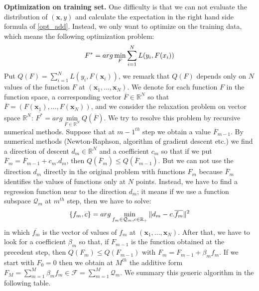 \documentclass[a4paper,twoside,12pt]{article}
\begin{document}
\textbf{Optimization on training set.} One difficulty is that we can not evaluate the distribution of $(\textbf{x}, y)$ and calculate the expectation in the right hand side formula of \eqref{opt_add}. Instead, we only want to optimize on the training data, which means the following optimization problem:
\begin{align}
    F^{*} = arg\min\limits_{F} \sum\limits_{i=1}^N L(y_i, F(x_i)) \notag
\end{align}
Put $Q(F) = \sum\limits_{i=1}^N L(y_i, F(\textbf{x}_i))$, we remark that $Q(F)$ depends only on $N$ values of the function $F$ at $(\textbf{x}_1,...,\textbf{x}_N)$. We denote for each function $F$ in the function space, a corresponding vector $\overline{F} \in \mathbb{R}^N$ so that $\overline{F} = (F(\textbf{x}_1),...,F(\textbf{x}_N))$, and we consider the relaxation problem on vector space $\mathbb{R}^N$: $\overline{F^{*}} = arg\min\limits_{\overline{F} \in \mathbb{R}^N} Q(\overline{F})$. We try to resolve this problem by recursive numerical methods. Suppose that at ${m-1}^{th}$ step we obtain a value $\overline{F}_{m-1}$. By numerical methods (Newton-Raphson, algorithm of gradient descent etc.) we find a direction of descent $d_m \in \mathbb{R}^N$ and a coefficient $c_m$ so that if we put $\overline{F}_m = \overline{F}_{m-1} + c_m.d_m$, then $Q(\overline{F}_m) \leq Q(\overline{F}_{m-1})$. But we can not use the direction $d_m$ directly in the original problem with functions $F_m$ because $\overline{F}_m$ identifies the values of functions only at $N$ points. Instead, we have to find a regression function near to the direction $d_m$; it means if we use a function subspace $\mathcal{Q}_m$ at $m^{th}$ step, then we have to solve:
\begin{align}
    \left\lbrace f_m, c\right\rbrace = arg\min\limits_{f_m\in \mathcal{Q}_m, c\in \mathbb{R}_{+}} \| d_m - c.\overline{f_m}\|^2 \notag
\end{align}
in which $\overline{f_m}$ is the vector of values of $f_m$ at $(\textbf{x}_1,...,\textbf{x}_N)$. After that, we have to look for a coefficient $\beta_m$ so that, if $F_{m-1}$ is the function obtained at the precedent step, then $Q(F_m) \leq Q(F_{m-1})$ with $F_m = F_{m-1} + \beta_mf_m$. If we start with $F_0 = 0$ then we obtain at $M^{th}$ the additive form $F_M = \sum\limits_{m=1}^M \beta_mf_m \in \mathcal{F} = \sum\limits_{m=1}^M \mathcal{Q}_m$. We summary this generic algorithm in the following table.
\end{document}
